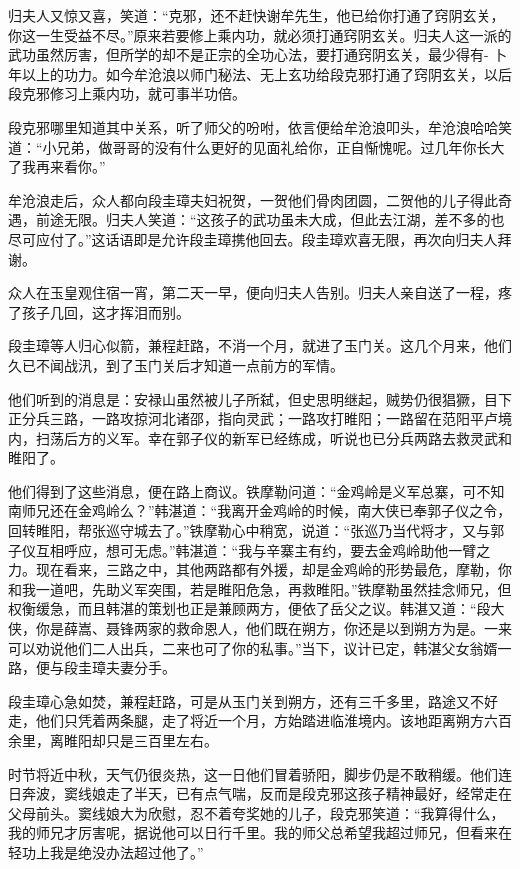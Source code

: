 \documentclass[12pt,oneside]{book}
\begin{document}
归夫人又惊又喜，笑道：``克邪，还不赶快谢牟先生，他已给你打通了窍阴玄关，你这一生受益不尽。''原来若要修上乘内功，就必须打通窍阴玄关。归夫人这一派的武功虽然厉害，但所学的却不是正宗的全功心法，要打通窍阴玄关，最少得有-
卜年以上的功力。如今牟沧浪以师门秘法、无上玄功给段克邪打通了窍阴玄关，以后段克邪修习上乘内功，就可事半功倍。

段克邪哪里知道其中关系，听了师父的吩咐，依言便给牟沧浪叩头，牟沧浪哈哈笑道：``小兄弟，做哥哥的没有什么更好的见面礼给你，正自惭愧呢。过几年你长大了我再来看你。''

牟沧浪走后，众人都向段圭璋夫妇祝贺，一贺他们骨肉团圆，二贺他的儿子得此奇遇，前途无限。归夫人笑道：``这孩子的武功虽未大成，但此去江湖，差不多的也尽可应付了。''这话语即是允许段圭璋携他回去。段圭璋欢喜无限，再次向归夫人拜谢。

众人在玉皇观住宿一宵，第二天一早，便向归夫人告别。归夫人亲自送了一程，疼了孩子几回，这才挥泪而别。

段圭璋等人归心似箭，兼程赶路，不消一个月，就进了玉门关。这几个月来，他们久已不闻战汛，到了玉门关后才知道一点前方的军情。

他们听到的消息是：安禄山虽然被儿子所弑，但史思明继起，贼势仍很猖獗，目下正分兵三路，一路攻掠河北诸邵，指向灵武；一路攻打睢阳；一路留在范阳平卢境内，扫荡后方的义军。幸在郭子仪的新军已经练成，听说也已分兵两路去救灵武和睢阳了。

他们得到了这些消息，便在路上商议。铁摩勒问道：``金鸡岭是义军总寨，可不知南师兄还在金鸡岭么？''韩湛道：``我离开金鸡岭的时候，南大侠已奉郭子仪之令，回转睢阳，帮张巡守城去了。''铁摩勒心中稍宽，说道：``张巡乃当代将才，又与郭子仪互相呼应，想可无虑。''韩湛道：``我与辛寨主有约，要去金鸡岭助他一臂之力。现在看来，三路之中，其他两路都有外援，却是金鸡岭的形势最危，摩勒，你和我一道吧，先助义军突围，若是睢阳危急，再救睢阳。''铁摩勒虽然挂念师兄，但权衡缓急，而且韩湛的策划也正是兼顾两方，便依了岳父之议。韩湛又道：``段大侠，你是薛嵩、聂锋两家的救命恩人，他们既在朔方，你还是以到朔方为是。一来可以劝说他们二人出兵，二来也可了你的私事。''当下，议计已定，韩湛父女翁婿一路，便与段圭璋夫妻分手。

段圭璋心急如焚，兼程赶路，可是从玉门关到朔方，还有三千多里，路途又不好走，他们只凭着两条腿，走了将近一个月，方始踏进临淮境内。该地距离朔方六百余里，离睢阳却只是三百里左右。

时节将近中秋，天气仍很炎热，这一日他们冒着骄阳，脚步仍是不敢稍缓。他们连日奔波，窦线娘走了半天，已有点气喘，反而是段克邪这孩子精神最好，经常走在父母前头。窦线娘大为欣慰，忍不着夸奖她的儿子，段克邪笑道：``我算得什么，我的师兄才厉害呢，据说他可以日行千里。我的师父总希望我超过师兄，但看来在轻功上我是绝没办法超过他了。''
\end{document}
